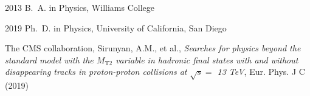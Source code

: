 \begin{frontmatter}
%
%
\begin{vitapage}
\begin{vita}
  \item[2013] B.~A. in Physics, Williams College
  \item[2019] Ph.~D. in Physics, University of California, San Diego
\end{vita}
\begin{publications}
\item The CMS collaboration, Sirunyan, A.M., et al., \emph{Searches for physics beyond the standard model with the $M_\mathrm{T2}$ variable in hadronic final states with and without disappearing tracks in proton-proton collisions at $\sqrt{s}=$ 13 TeV}, Eur. Phys. J C (2019)
\end{publications}
\end{vitapage}


%
%
\begin{abstract}


\end{abstract}
\end{frontmatter}
